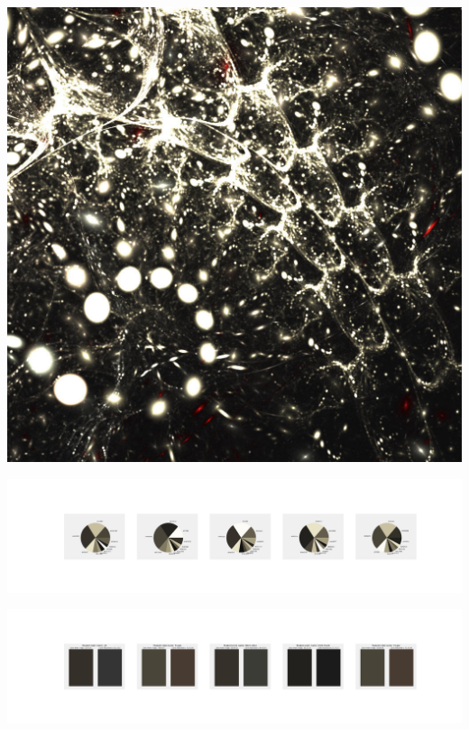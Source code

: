 \documentclass[11pt]{article}
\begin{document}
\begin{landscape}
    \begin{center}
    \includegraphics[width=\textwidth]{./nbimg/file (131).jpg}
    \end{center}

    \begin{center}
    \includegraphics[width=250mm]{./nbimg/pie-36.jpg}
    \end{center}

    \begin{center}
    \includegraphics[width=250mm]{./nbimg/peak-36.jpg}
    \end{center}
    


\end{landscape}
\end{document}
